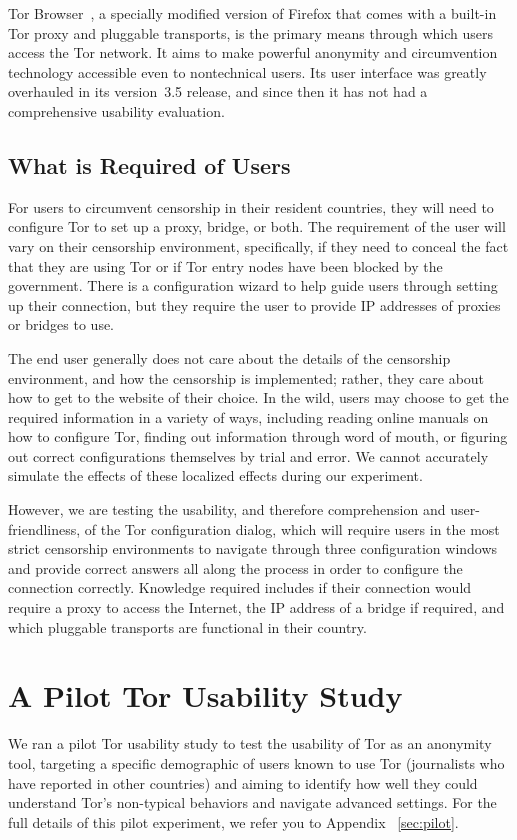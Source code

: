 \documentclass[letterpaper,twocolumn,11pt]{article}
\begin{document}
Tor Browser~\cite{tor-browser},
a specially modified version of Firefox that comes
with a built-in Tor proxy and pluggable transports,
is the primary means through which users access the Tor network.
It aims to make powerful anonymity and circumvention technology
accessible even to nontechnical users.
Its user interface was greatly overhauled in its version~3.5 release,
and since then it has not had a comprehensive usability evaluation.

\subsection{What is Required of Users}
\indent \indent For users to circumvent censorship in their resident countries, they will need to 
configure Tor to set up a proxy, bridge, or both. The requirement of the user will vary on their censorship
environment, specifically, if they need to conceal the fact that they are using Tor or if Tor entry nodes 
have been blocked by the government. There is a configuration wizard to help guide users through setting up their connection, but they require the user to provide IP addresses of proxies or bridges to use.

The end user generally does not care about the details of the 
censorship environment, and how the censorship is implemented; rather, they care about how to get
to the website of their choice. In the wild, users may choose to get the required information in a variety 
of ways, including reading online manuals on how to configure Tor, finding out information through word of mouth, 
or figuring out correct configurations themselves by trial and error.  We cannot accurately simulate the effects
of these localized effects during our experiment.

However, we are testing the usability, and therefore comprehension and user-friendliness, of the Tor configuration 
dialog, which will require users in the most strict censorship environments to navigate through three configuration windows and provide correct answers all along the process in order to configure the connection correctly. Knowledge
required includes if their connection would require a proxy to access the Internet, the IP address of a bridge if required, 
and which pluggable transports are functional in their country. 

\section{A Pilot Tor Usability Study} 
\indent \indent We ran a pilot Tor usability study to test the usability of Tor as an anonymity tool,
targeting a specific demographic of users known to use Tor (journalists who have reported in other
countries) and aiming to identify how well they could understand Tor's non-typical behaviors and 
navigate advanced settings. For the full details of this pilot experiment, we refer you to Appendix ~\ref{sec:pilot}.  
\end{document}
